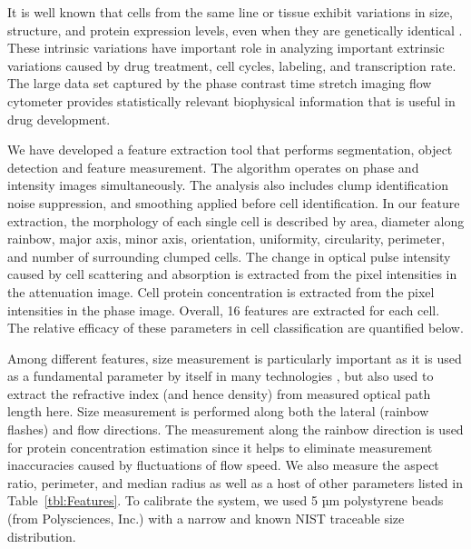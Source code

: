 \documentclass[aps,pra,preprint,superscriptaddress]{revtex4-1}
\begin{document}
It is well known that cells from the same line or tissue exhibit variations in size, structure, and protein expression levels, even when they are genetically identical \cite{CP paper}. These intrinsic variations have important role in analyzing important extrinsic variations caused by drug treatment, cell cycles, labeling, and transcription rate. The large data set captured by the phase contrast time stretch imaging flow cytometer provides statistically relevant biophysical information that is useful in drug development.

We have developed a feature extraction tool that performs segmentation, object detection and feature measurement. The algorithm operates on phase and intensity images simultaneously. The analysis also includes clump identification noise suppression, and smoothing applied before cell  identification. In our feature extraction, the morphology of each single cell is described by area, diameter along rainbow, major axis, minor axis, orientation, uniformity, circularity, perimeter, and number of surrounding clumped cells. The change in optical pulse intensity caused by cell scattering and absorption is extracted from the pixel intensities in the attenuation image. Cell protein concentration is extracted from the pixel intensities in the phase image. Overall, 16 features are extracted for each cell. The relative efficacy of these parameters in cell classification are quantified below.

Among different features, size measurement is particularly important as it is used as a fundamental parameter by itself in many technologies \cite{}, but also used to extract the refractive index (and hence density) from measured optical path length here. Size measurement is performed along both the lateral (rainbow flashes) and flow directions. The measurement along the rainbow direction is used for protein concentration estimation since it helps to eliminate measurement inaccuracies caused by fluctuations of flow speed. We also measure the aspect ratio, perimeter, and median radius as well as a host of other parameters listed in Table~\ref{tbl:Features}. To calibrate the system, we used 5 µm polystyrene beads (from Polysciences, Inc.) with a narrow and known NIST traceable size distribution.
\end{document}
